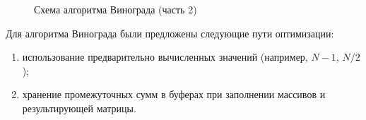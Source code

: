 \begin{figure}[h!]
	\caption{Схема алгоритма Винограда (часть 2)}
	\label{pic_vinograd_2}
\end{figure}
\clearpage

Для алгоритма Винограда были предложены следующие пути оптимизации:
\begin{enumerate}
	\item использование предварительно вычисленных значений (например, $N-1$, $N/2$);
	\item хранение промежуточных сумм в буферах при заполнении массивов и результирующей матрицы.
\end{enumerate}

